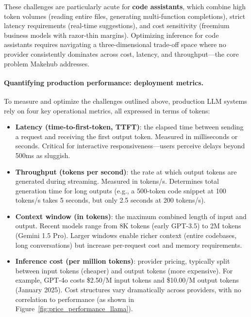 \documentclass[english]{article}
\begin{document}
\medskip

\noindent These challenges are particularly acute for \textbf{code assistants}, which combine high token volumes (reading entire files, generating multi-function completions), strict latency requirements (real-time suggestions), and cost sensitivity (freemium business models with razor-thin margins). Optimizing inference for code assistants requires navigating a three-dimensional trade-off space where no provider consistently dominates across cost, latency, and throughput—the core problem Makehub addresses.

\paragraph{Quantifying production performance: deployment metrics.}

To measure and optimize the challenges outlined above, production LLM systems rely on four key operational metrics, all expressed in terms of tokens:

\begin{itemize}
    \item \textbf{Latency (time-to-first-token, TTFT)}: the elapsed time between sending a request and receiving the first output token. Measured in milliseconds or seconds. Critical for interactive responsiveness—users perceive delays beyond 500ms as sluggish.

    \item \textbf{Throughput (tokens per second)}: the rate at which output tokens are generated during streaming. Measured in tokens/s. Determines total generation time for long outputs (e.g., a 500-token code snippet at 100 tokens/s takes 5 seconds, but only 2.5 seconds at 200 tokens/s).

    \item \textbf{Context window (in tokens)}: the maximum combined length of input and output. Recent models range from 8K tokens (early GPT-3.5) to 2M tokens (Gemini 1.5 Pro). Larger windows enable richer context (entire codebases, long conversations) but increase per-request cost and memory requirements.

    \item \textbf{Inference cost (per million tokens)}: provider pricing, typically split between input tokens (cheaper) and output tokens (more expensive). For example, GPT-4o costs \$2.50/M input tokens and \$10.00/M output tokens (January 2025). Cost structures vary dramatically across providers, with no correlation to performance (as shown in Figure~\ref{fig:price_performance_llama}).
\end{itemize}
\end{document}
